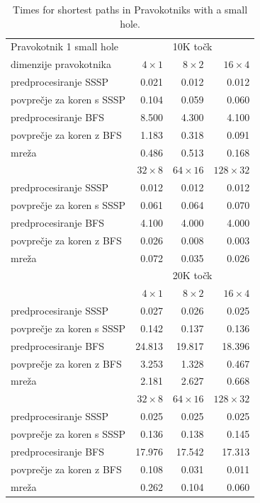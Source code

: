 \documentclass[a4paper, 12pt]{book}
\begin{document}
\begin{table}
\begin{center}
\begin{tabular}{l*{3}{r}}
Pravokotnik 1 small hole & \multicolumn{3}{c}{10K točk}\\						
dimenzije pravokotnika	&	$4\times 1$	&	$8\times 2$	&	$16\times 4$		\\
\hline
predprocesiranje SSSP	&	0.021	&	0.012	&	0.012		\\
povprečje za koren s SSSP	&	0.104	&	0.059	&	0.060		\\
predprocesiranje BFS	&	8.500	&	4.300	&	4.100		\\
povprečje za koren z BFS	&	1.183	&	0.318	&	0.091		\\
mreža	&	0.486	&	0.513	&	0.168  \vspace{.2cm}	\\
&	$32\times 8$	&	$64\times 16$	&	$128\times 32$ \\
predprocesiranje SSSP &	0.012	&	0.012	&	0.012 \\
povprečje za koren s SSSP &	0.061	&	0.064	&	0.070 \\
predprocesiranje BFS &	4.100	&	4.000	&	4.000 \\
povprečje za koren z BFS &	0.026	&	0.008	&	0.003 \\
mreža &	0.072	&	0.035	&	0.026\vspace{.2cm} \\
\hline
  & \multicolumn{3}{c}{20K točk}\\
  &	$4\times 1$	&	$8\times 2$	&	$16\times 4$		\\  			
\hline
predprocesiranje SSSP	&	0.027	&	0.026	&	0.025	\\
povprečje za koren s SSSP	&	0.142	&	0.137	&	0.136	\\
predprocesiranje BFS	&	24.813	&	19.817	&	18.396	\\
povprečje za koren z BFS	&	3.253	&	1.328	&	0.467	\\
mreža				&	2.181	&	2.627	&	0.668	\\
&	$32\times 8$	&	$64\times 16$	&	$128\times 32$ \\
predprocesiranje SSSP &	0.025	&	0.025	&	0.025	\\
povprečje za koren s SSSP &	0.136	&	0.138	&	0.145	\\
predprocesiranje BFS &	17.976	&	17.542	&	17.313	\\
povprečje za koren z BFS &	0.108	&	0.031	&	0.011	\\
mreža &	0.262	&	0.104	&	0.060 
\end{tabular}
\caption{Times for shortest paths in Pravokotniks with a small hole.}
\label{table2}
\end{center}
\end{table}
\end{document}

